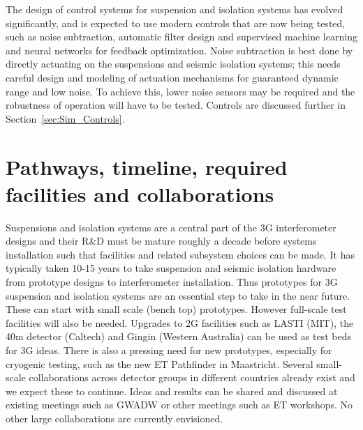  The design of control systems for suspension and isolation systems has evolved significantly, and is expected to use modern controls that are now being tested, such as noise subtraction, automatic filter design and supervised machine learning and neural networks for feedback optimization. 
Noise subtraction is best done by directly actuating on the suspensions and seismic isolation systems; this needs careful design and modeling of actuation mechanisms for guaranteed dynamic range and low noise.  To achieve this, lower noise sensors may be required and the robustness of operation will have to be tested. Controls are discussed further in Section~\ref{sec:Sim_Controls}.

\section{Pathways, timeline, required facilities and collaborations}

Suspensions and isolation systems are a central part of the 3G interferometer designs and their R\&D must be mature roughly a decade before systems installation such that facilities and related subsystem choices can be made. It has typically taken 10-15 years to take suspension and seismic isolation hardware from prototype designs to interferometer installation. Thus prototypes for 3G suspension and isolation systems are an essential step to take in the near future. These can start with small scale (bench top) prototypes. However full-scale test facilities will also be needed. Upgrades to 2G facilities such as LASTI (MIT), the 40m detector (Caltech) and Gingin (Western Australia) can be used as test beds for 3G ideas. There is also a pressing need for new prototypes, especially for cryogenic testing, such as the new ET Pathfinder in Maastricht. Several small-scale collaborations across detector groups in different countries already exist and we expect these to continue.  Ideas and results can be shared and discussed at existing meetings such as GWADW or other meetings such as ET workshops. No other large collaborations are currently envisioned.



